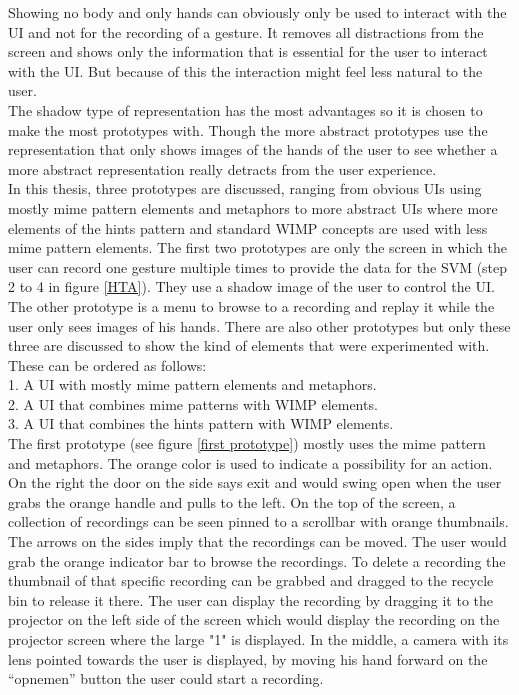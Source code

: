 Showing no body and only hands can obviously only be used to interact with the UI and not for the recording of a gesture. It removes all distractions from the screen and shows only the information that is essential for the user to interact with the UI. But because of this the interaction might feel less natural to the user.\\
 
The shadow type of representation has the most advantages so it is chosen to make the most prototypes with. Though the more abstract prototypes use the representation that only shows images of the hands of the user to see whether a more abstract representation really detracts from the user experience.\\
 
In this thesis, three prototypes are discussed, ranging from obvious UIs using mostly mime pattern elements and metaphors to more abstract UIs where more elements of the hints pattern and standard WIMP concepts are used with less mime pattern elements. The first two prototypes are only the screen in which the user can record one gesture multiple times to provide the data for the SVM (step 2 to 4 in figure \ref{HTA}). They use a shadow image of the user to control the UI. The other prototype is a menu to browse to a recording and replay it while the user only sees images of his hands. There are also other prototypes but only these three are discussed to show the kind of elements that were experimented with. These can be ordered as follows:\\

1. A UI with mostly mime pattern elements and metaphors.\\
2. A UI that combines mime patterns with WIMP elements.\\
3. A UI that combines the hints pattern with WIMP elements.\\

The first prototype (see figure \ref{first prototype}) mostly uses the mime pattern and metaphors. The orange color is used to indicate a possibility for an action. On the right the door on the side says exit and would swing open when the user grabs the orange handle and pulls to the left. On the top of the screen, a collection of recordings can be seen pinned to a scrollbar with orange thumbnails. The arrows on the sides imply that the recordings can be moved. The user would grab the orange indicator bar to browse the recordings. To delete a recording the thumbnail of that specific recording can be grabbed and dragged to the recycle bin to release it there. The user can display the recording by dragging it to the projector on the left side of the screen which would display the recording on the projector screen where the large "1" is displayed. In the middle, a camera with its lens pointed towards the user is displayed, by moving his hand forward on the ``opnemen'' button the user could start a recording.\\

